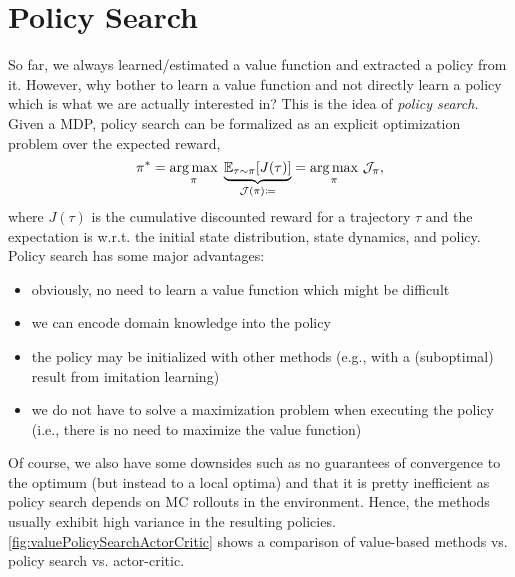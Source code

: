 \chapter{Policy Search}
	So far, we always learned/estimated a value function and extracted a policy from it. However, why bother to learn a value function and not directly learn a policy which is what we are actually interested in? This is the idea of \emph{policy search.} Given a \ac{MDP}, policy search can be formalized as an explicit optimization problem over the expected reward,
	\begin{equation}
		\pi^\ast
		= \operatorname*{arg\,max}_\pi \; \underbrace{\mathbb{E}_{\tau \sim \pi}[J(\tau)]}_{\mathcal{J}(\pi) \coloneqq}
		= \operatorname*{arg\,max}_\pi \, \mathcal{J}_\pi,
		\label{eq:policySearchOptPart}
	\end{equation}
	where \(J(\tau)\) is the cumulative discounted reward for a trajectory \(\tau\) and the expectation is w.r.t. the initial state distribution, state dynamics, and policy. Policy search has some major advantages:
	\begin{itemize}
		\item obviously, no need to learn a value function which might be difficult
		\item we can encode domain knowledge into the policy
		\item the policy may be initialized with other methods (e.g., with a (suboptimal) result from imitation learning)
		\item we do not have to solve a maximization problem when executing the policy (i.e., there is no need to maximize the value function)
	\end{itemize}
	Of course, we also have some downsides such as no guarantees of convergence to the optimum (but instead to a local optima) and that it is pretty inefficient as policy search depends on \ac{MC} rollouts in the environment. Hence, the methods usually exhibit high variance in the resulting policies. \autoref{fig:valuePolicySearchActorCritic} shows a comparison of value-based methods vs. policy search vs. actor-critic.

